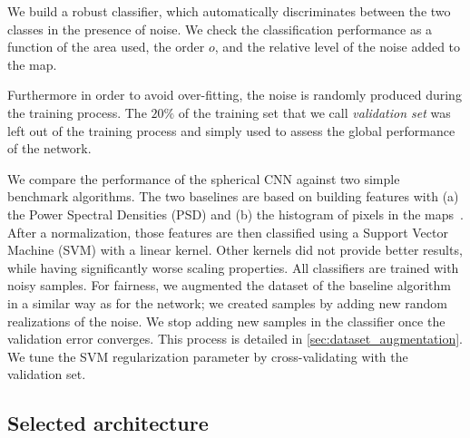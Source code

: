 \documentclass[final,twocolumn,3p,times,authoryear]{elsarticle}
\newcommand{\1}{\b{1}}              %
\newcommand{\0}{\b{0}}              %
\begin{document}
We build a robust classifier, which automatically discriminates between the two classes in the presence of noise.
We check the classification performance as a function of the area used, the order $o$, and the relative level of the noise added to the map.

Furthermore in order to avoid over-fitting, the noise is randomly produced during the training process.
The $20\%$ of the training set that we call \emph{validation set} was left out of the training process and simply used to assess the global performance of the network.


We compare the performance of the spherical CNN against two simple benchmark algorithms.
The two baselines are based on building features with
(a) the Power Spectral Densities (PSD) and
(b) the histogram of pixels in the maps~\cite{patton2017cosmologicalconstraints}.
After a normalization, those features are then classified using a Support Vector Machine (SVM) with a linear kernel.
Other kernels did not provide better results, while having significantly worse scaling properties.
All classifiers are trained with noisy samples.
For fairness, we augmented the dataset of the baseline algorithm in a similar way as for the network; we created samples by adding new random realizations of the noise.
We stop adding new samples in the classifier once the validation error converges.
This process is detailed in \ref{sec:dataset_augmentation}.
We tune the SVM regularization parameter by cross-validating with the validation set.

\subsection{Selected architecture}
\label{sec:selected_architecture}
\end{document}
